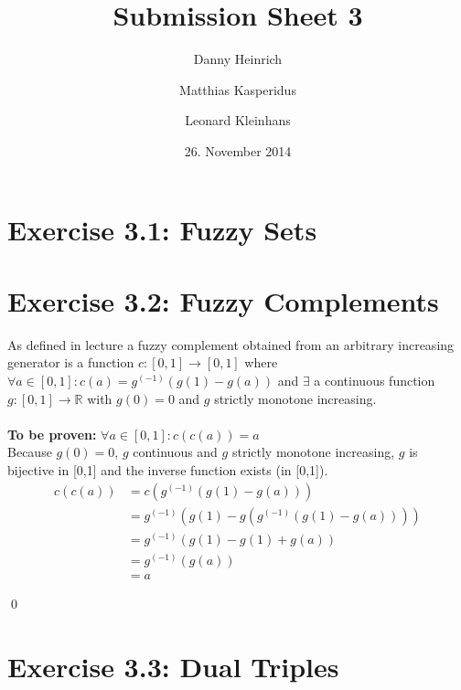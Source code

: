\documentclass{scrartcl}
\title{Submission Sheet 3}
\author{Danny Heinrich \and Matthias Kasperidus \and Leonard Kleinhans}
\date{26. November 2014}
\begin{document}
\maketitle

\section{Exercise 3.1: Fuzzy Sets}

\section{Exercise 3.2: Fuzzy Complements}
As defined in lecture a fuzzy complement obtained from an arbitrary increasing generator is a function $c: [0,1] \to [0,1]$ where
$\forall a \in [0,1]: c(a) = g^{(-1)}\left(g(1)-g(a)\right)$ and $\exists$ a continuous function $g:[0,1] \to \mathds{R}$ with $g(0) = 0$ and $g$ strictly monotone increasing. \\
\\

\textbf{To be proven:} $\forall a \in [0,1]: c(c(a)) = a$ \\
Because $g(0) = 0$, $g$ continuous and $g$ strictly monotone increasing, $g$ is bijective in [0,1] and the inverse function exists (in [0,1]).
\begin{align*}
        c(c(a)) &= c \left( g^{(-1)} \left( g(1) - g(a) \right) \right) \\
                &= g^{(-1)} \left( g(1) - g \left( g^{(-1)} \left( g(1) - g(a) \right) \right) \right) \\
                &= g^{(-1)} \left( g(1)-g(1)+g(a) \right) \\
                &= g^{(-1)} \left( g(a) \right) \\
                &= a 
\end{align*}
    
\qed

\section{Exercise 3.3: Dual Triples}
\end{document}
